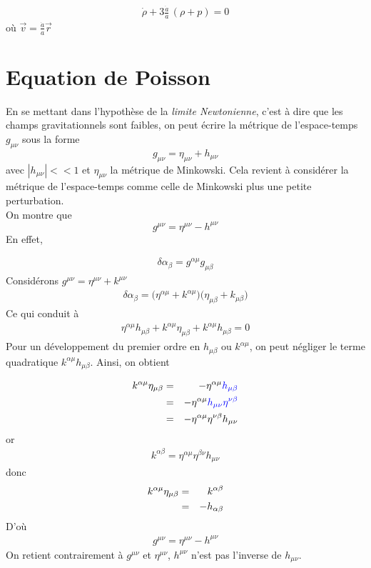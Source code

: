 \documentclass[a4paper,12pt]{report}
\theoremstyle{plain}
\theoremstyle{plain}
\begin{document}
\begin{eqnarray}
 \dot{\rho} + 3 \frac{\dot{a}}{a} \,(\rho + p)=0
\end{eqnarray}
o\`u $\vec{v}= \frac{\dot{a}}{a} \vec{r}$
\section{Equation de Poisson}\label{11poisson}
En se mettant dans l'hypoth\`ese de la {\it limite Newtonienne}, c'est \`a dire que les champs gravitationnels sont faibles, 
on peut \'ecrire la m\'etrique de l'espace-temps $g_{\mu\nu}$ sous la forme
\begin{equation}\label{b1gnunu}
  g_{\mu\nu}= \eta_{\mu\nu} + h_{\mu\nu} 
\end{equation}
 avec  $ |h_{\mu\nu} | << 1 $ et  $\eta_{\mu\nu}$ la m\'etrique de Minkowski. Cela revient \`a consid\'erer la m\'etrique 
 de l'espace-temps comme celle de Minkowski plus une petite perturbation.\\
 On montre que 
\begin{equation}\label{b1gum}
  g^{\mu\nu}= \eta^{\mu\nu} - h^{\mu\nu}  
\end{equation}
En effet,

\begin{eqnarray}
 \delta\alpha_\beta= g^{\alpha\mu}g_{\mu\beta}
\end{eqnarray}
Consid\'erons \; $g^{\mu\nu}= \eta^{\mu\nu} + k^{\mu\nu} $
\begin{eqnarray}
  \delta\alpha_\beta= \Big(\eta^{\alpha\mu} + k^{\alpha\mu}\Big)\Big(\eta_{\mu\beta} + k_{\mu\beta}\Big)
\end{eqnarray}
Ce qui conduit \`a
\begin{eqnarray}
 \eta^{\alpha\mu}  h_{\mu\beta} + k^{\alpha\mu}  \eta_{\mu\beta} + k^{\alpha\mu}  h_{\mu\beta} =0
\end{eqnarray}
Pour un d\'eveloppement du premier ordre en $ h_{\mu\beta}$ ou $k^{\alpha\mu}$, on peut n\'egliger le terme quadratique 
$k^{\alpha\mu}  h_{\mu\beta} $. Ainsi, on obtient  

\begin{eqnarray}
 k^{\alpha\mu}  \eta_{\mu\beta}&=& - \eta^{\alpha\mu} {\color{blue} h_{\mu\beta} } \cr
   &=&  - \eta^{\alpha\mu}  {\color{blue}   h_{\mu\nu}\eta^{\nu\beta}} \cr
  & =& - \eta^{\alpha\mu}    \eta^{\nu\beta}h_{\mu\nu}
\end{eqnarray}
or
\begin{eqnarray}
  k^{\alpha\beta}= \eta^{\alpha\mu}    \eta^{\beta\nu}h_{\mu\nu}
\end{eqnarray}
donc
\begin{eqnarray}
 k^{\alpha\mu}  \eta_{\mu\beta}&=&k^{\alpha\beta} \cr
 &=& - h_{\alpha\beta} 
\end{eqnarray}
D'o\`u 
\begin{eqnarray}
  g^{\mu\nu}= \eta^{\mu\nu} - h^{\mu\nu}
\end{eqnarray}
On retient contrairement \`a $g^{\mu\nu}$ et $\eta^{\mu\nu}$,  $h^{\mu\nu}$ n'est pas l'inverse de $h_{\mu\nu}$.\\
\end{document}

